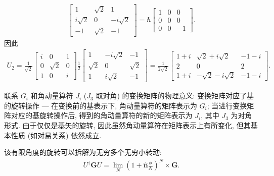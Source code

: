 \documentclass{assignment}
\begin{document}
\begin{pf}
\begin{align}
\begin{bmatrix}
            1&\sqrt{2}&1\\
            i\sqrt{2}&0&-i\sqrt{2}\\
            -1&\sqrt{2}&-1
        \end{bmatrix}=\hbar\begin{bmatrix}
            1&0&0\\
            0&0&0\\
            0&0&-1
        \end{bmatrix}.
    \end{align}
    因此
    \begin{align}
        U_2=\frac{1}{\sqrt{2}}\begin{bmatrix}
            i&0&1\\
            0&\sqrt{2}&0\\
            1&0&i
        \end{bmatrix}\frac{1}{2}\begin{bmatrix}
            1&-i\sqrt{2}&-1\\
            \sqrt{2}&0&\sqrt{2}\\
            1&i\sqrt{2}&-1
        \end{bmatrix}=\frac{1}{2\sqrt{2}}\begin{bmatrix}
            1+i&\sqrt{2}+i\sqrt{2}&-1-i\\
            2&0&2\\
            1+i&-\sqrt{2}-i\sqrt{2}&-1-i
        \end{bmatrix}.
    \end{align}

    联系 $G_i$ 和角动量算符 $J_i$ ($J_3$ 取对角) 的变换矩阵的物理意义: 变换矩阵对应了基的旋转操作 --- 在变换前的基表示下, 角动量算符的矩阵表示为 $G_i$; 当进行变换矩阵对应的基旋转操作后, 得到的角动量算符的新的矩阵表示为 $J_i$, 其中 $J_3$ 为对角形式. 由于仅仅是基矢的旋转, 因此虽然角动量算符在矩阵表示上有所变化, 但其基本性质 (如对易关系) 依然成立.

    该有限角度的旋转可以拆解为无穷多个无穷小转动:
    \begin{align}
        U^{\dagger}\bm{G}U=\lim_N(1+\hat{\bm{n}}\frac{\phi}{N})^N\times\bm{G}.
    \end{align}
\end{pf}
\end{document}

